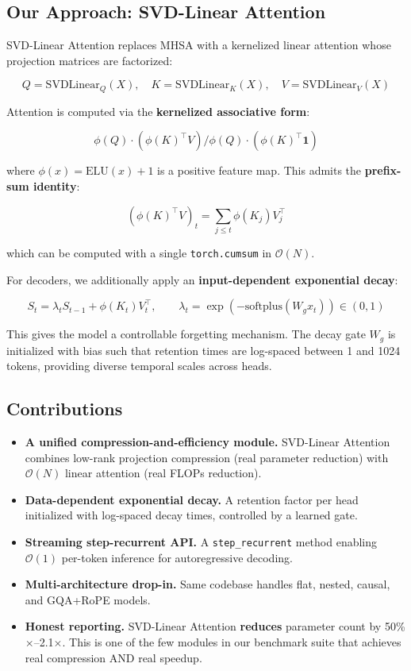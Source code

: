 \subsection{Our Approach: SVD-Linear Attention}

SVD-Linear Attention replaces MHSA with a kernelized linear attention whose 
projection matrices are factorized:

\[
Q = \text{SVDLinear}_Q(X), \quad K = \text{SVDLinear}_K(X), \quad V = \text{SVDLinear}_V(X)
\tag{1.1}
\]

Attention is computed via the \textbf{kernelized associative form}:

\[
\phi(Q) \cdot (\phi(K)^\top V) \big/ \phi(Q) \cdot (\phi(K)^\top \mathbf{1})
\tag{1.2}
\]

where $\phi(x) = \text{ELU}(x) + 1$ is a positive feature map. This admits 
the \textbf{prefix-sum identity}:

\[
(\phi(K)^\top V)_t = \sum_{j \leq t} \phi(K_j) V_j^\top
\tag{1.3}
\]

which can be computed with a single \texttt{torch.cumsum} in $\mathcal{O}(N)$.

For decoders, we additionally apply an \textbf{input-dependent exponential decay}:

\[
S_t = \lambda_t S_{t-1} + \phi(K_t) V_t^\top, \qquad
\lambda_t = \exp(-\text{softplus}(W_g x_t)) \in (0, 1)
\tag{1.4}
\]

This gives the model a controllable forgetting mechanism. The decay gate 
$W_g$ is initialized with bias such that retention times are log-spaced 
between 1 and 1024 tokens, providing diverse temporal scales across heads.

\subsection{Contributions}

\begin{itemize}
\item \textbf{A unified compression-and-efficiency module.} SVD-Linear Attention
  combines low-rank projection compression (real parameter reduction) with
  $\mathcal{O}(N)$ linear attention (real FLOPs reduction).
\item \textbf{Data-dependent exponential decay.} A retention factor per head
  initialized with log-spaced decay times, controlled by a learned gate.
\item \textbf{Streaming step-recurrent API.} A \texttt{step\_recurrent} method enabling
  $\mathcal{O}(1)$ per-token inference for autoregressive decoding.
\item \textbf{Multi-architecture drop-in.} Same codebase handles flat, nested,
  causal, and GQA+RoPE models.
\item \textbf{Honest reporting.} SVD-Linear Attention \textbf{reduces} parameter count
  by 50\%$\times$--2.1$\times$. This is one of the few modules in our
  benchmark suite that achieves real compression AND real speedup.

\end{itemize}
